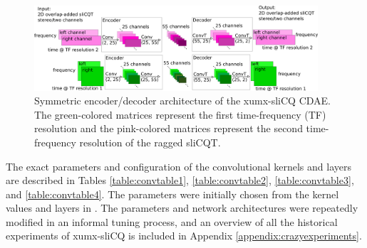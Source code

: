 \documentclass[report.tex]{subfiles}
\begin{document}
\begin{figure}[ht]
	\centering
	\includegraphics[width=0.9375\textwidth]{./images-blockdiagrams/xumx_slicq_cdae.png}
	\caption{Symmetric encoder/decoder architecture of the xumx-sliCQ CDAE. The green-colored matrices represent the first time-frequency (TF) resolution and the pink-colored matrices represent the second time-frequency resolution of the ragged sliCQT.}
	\label{fig:newcdaefig}
\end{figure}

The exact parameters and configuration of the convolutional kernels and layers are described in Tables \ref{table:convtable1}, \ref{table:convtable2}, \ref{table:convtable3}, and \ref{table:convtable4}. The parameters were initially chosen from the kernel values and layers in \textcite{plumbley1, plumbley2}. The parameters and network architectures were repeatedly modified in an informal tuning process, and an overview of all the historical experiments of xumx-sliCQ is included in Appendix \ref{appendix:crazyexperiments}.
\end{document}
